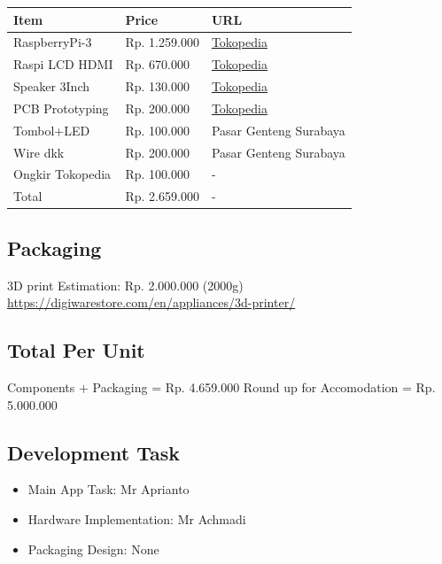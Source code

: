 \documentclass[a4paper,12pt,oneside,pdflatex,italian,final,twocolumn]{article}
\begin{document}
\centering
\begin{tabular}{|l|l|l|}
\toprule
Item & Price & URL \\
\midrule
RaspberryPi-3 & Rp. 1.259.000 & \href{https://www.tokopedia.com/libra-1/terbaru-raspberry-pi-3-model-b-1gb-ram-quad-core-1-2-ghz-with-wifi}{Tokopedia}  \\
Raspi LCD HDMI & Rp. 670.000 & \href{https://www.tokopedia.com/unorobotic/lcd-7-inci-raspberry-pi-ips-touchscreen-hdmi}{Tokopedia} \\
Speaker 3Inch & Rp. 130.000 & \href{https://www.tokopedia.com/jayaabadielectric/speaker-komponen-6-inch-lad-0806-original}{Tokopedia} \\
PCB Prototyping & Rp. 200.000 & \href{https://www.tokopedia.com/geraicerdas/cetak-pcb-1-keping-single-double-layer-rapid-prototyping-satuan}{Tokopedia} \\
Tombol+LED & Rp. 100.000 & Pasar Genteng Surabaya \\
Wire dkk & Rp. 200.000 & Pasar Genteng Surabaya \\
Ongkir Tokopedia & Rp. 100.000 & - \\
\midrule
Total & Rp. 2.659.000 & - \\
\bottomrule
\end{tabular}

\raggedright
\subsection{Packaging}

3D print Estimation: Rp. 2.000.000 (2000g)\\
\url{https://digiwarestore.com/en/appliances/3d-printer/}

\subsection{Total Per Unit}
Components + Packaging = Rp. 4.659.000
Round up for Accomodation = Rp. 5.000.000

\subsection{Development Task}
\begin{itemize}
    \item Main App Task: Mr Aprianto
    \item Hardware Implementation: Mr Achmadi
    \item Packaging Design: None
\end{itemize}
\end{document}
